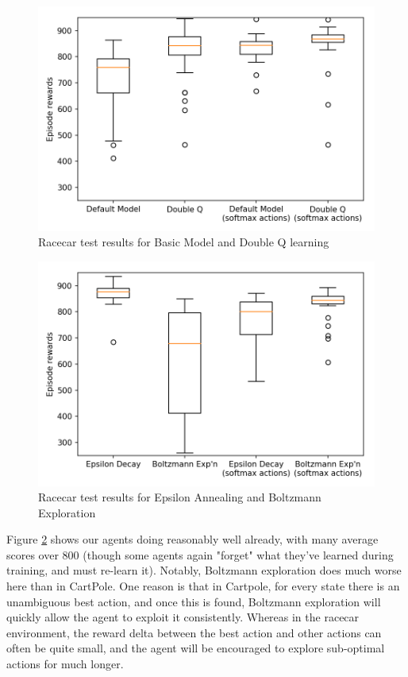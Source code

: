 \documentclass[a4paper, 11pt, conference]{ieeeconf}      %
\begin{document}
\begin{figure}
  \includegraphics[width=\linewidth]{figs/racecar_1.png}
  \caption{Racecar test results for Basic Model and Double Q learning}
  \label{fig:test1}
\end{figure}

\begin{figure}
  \includegraphics[width=\linewidth]{figs/racecar_2.png}
  \caption{Racecar test results for Epsilon Annealing and Boltzmann Exploration}
  \label{fig:test2}
\end{figure}

Figure \ref{fig:test2} shows our agents doing reasonably well already, with many average scores over 800 (though some agents again "forget" what they've learned during training, and must re-learn it). Notably, Boltzmann exploration does much worse here than in CartPole. One reason is that in Cartpole, for every state there is an unambiguous best action, and once this is found, Boltzmann exploration will quickly allow the agent to exploit it consistently. Whereas in the racecar environment, the reward delta between the best action and other actions can often be quite small, and the agent will be encouraged to explore sub-optimal actions for much longer.
\end{document}
